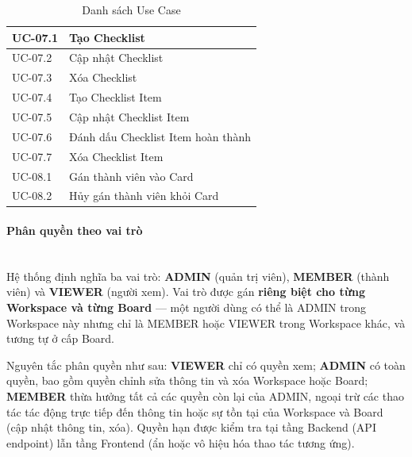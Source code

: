 \begin{table}[H]
\begin{tabular}{|p{3cm}|p{11cm}|}
UC-07.1 & Tạo Checklist \\
\hline
UC-07.2 & Cập nhật Checklist \\
\hline
UC-07.3 & Xóa Checklist \\
\hline
UC-07.4 & Tạo Checklist Item \\
\hline
UC-07.5 & Cập nhật Checklist Item \\
\hline
UC-07.6 & Đánh dấu Checklist Item hoàn thành \\
\hline
UC-07.7 & Xóa Checklist Item \\
\hline
UC-08.1 & Gán thành viên vào Card \\
\hline
UC-08.2 & Hủy gán thành viên khỏi Card \\
\hline
\end{tabular}
\caption{Danh sách Use Case}
\label{tab:usecase_list}
\end{table}

\paragraph{Phân quyền theo vai trò} \mbox{}\\

Hệ thống định nghĩa ba vai trò: \textbf{ADMIN} (quản trị viên), \textbf{MEMBER} (thành viên) và \textbf{VIEWER} (người xem). Vai trò được gán \textbf{riêng biệt cho từng Workspace và từng Board} — một người dùng có thể là ADMIN trong Workspace này nhưng chỉ là MEMBER hoặc VIEWER trong Workspace khác, và tương tự ở cấp Board.

Nguyên tắc phân quyền như sau: \textbf{VIEWER} chỉ có quyền xem; \textbf{ADMIN} có toàn quyền, bao gồm quyền chỉnh sửa thông tin và xóa Workspace hoặc Board; \textbf{MEMBER} thừa hưởng tất cả các quyền còn lại của ADMIN, ngoại trừ các thao tác tác động trực tiếp đến thông tin hoặc sự tồn tại của Workspace và Board (cập nhật thông tin, xóa). Quyền hạn được kiểm tra tại tầng Backend (API endpoint) lẫn tầng Frontend (ẩn hoặc vô hiệu hóa thao tác tương ứng).

